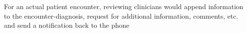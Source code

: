 \documentclass[a4paper,10pt]{article}
\begin{document}
\begin{flushleft}
\begin{tabular}{ c c }
\end{tabular}
\end{flushleft}

For an actual patient encounter, reviewing clinicians would append information 
to the encounter-diagnosis, request for additional information, comments, etc.
and send a notification back to the phone
\end{document}
